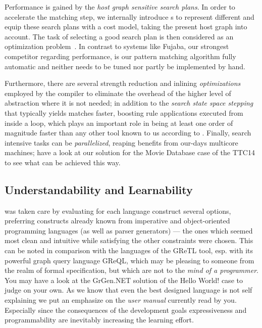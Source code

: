 Performance is gained by the \emph{host graph sensitive search plans}.
In order to accelerate the matching step, we internally introduce s
to represent different  and equip these search plans with a cost model, taking the present host graph into account.
The task of selecting a good search plan is then considered as an optimization problem~\cite{BKG:07,Bat:06}.
In contrast to systems like Fujaba\cite{fujaba,fuj}, our strongest competitor regarding performance,
is our pattern matching algorithm fully automatic and neither needs to be tuned nor partly be implemented by hand.

Furthermore, there are several strength reduction and inlining \emph{optimizations} employed by the compiler to eliminate the overhead of the higher level of abstraction where it is not needed;
in addition to the \emph{search state space stepping} that typically yields matches faster,
boosting rule applications executed from inside a loop,
which plays an important role in being at least one order of magnitude faster than any other tool known to us according to \cite{varro_bench}.
Finally, search intensive tasks can be \emph{parallelized}, reaping benefits from our-days multicore machines; have a look at our solution for the Movie Database case of the TTC14\cite{MovieDatabase} to see what can be achieved this way.

\subsection*{Understandability and Learnability}
was taken care by evaluating for each language construct several options,
preferring constructs already known from imperative and object-oriented programming languages (as well as parser generators) ---
the ones which seemed most clean and intuitive while satisfying the other constraints were chosen.
This can be noted in comparison with the languages of the GReTL \cite{GReTL} tool, esp. with its powerful graph query language GReQL,
which may be pleasing to someone from the realm of formal specification, but which are not to the \emph{mind of a programmer}.
You may have a look at the GrGen.NET solution of the Hello World! case \cite{HelloWorld} to judge on your own.
As we know that even the best designed language is not self explaining we put an emphasize on the \emph{user manual} currently read by you.
Especially since the consequences of the development goals expressiveness and programmability are inevitably increasing the learning effort.

